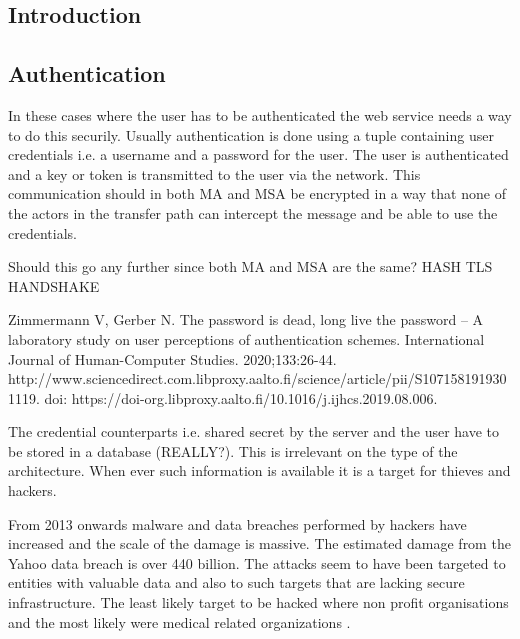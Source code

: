 \subsection{Introduction}

\subsection{Authentication}
\begin{sloppypar}
    In these cases where the user has to be authenticated the web service needs 
    a way to do this securily. Usually authentication is done using a tuple 
    containing user credentials i.e. a username and a password for the user. The
    user is authenticated and a key or token is transmitted to the user via the 
    network. This communication should in both MA and MSA be encrypted in a way 
    that none of the actors in the transfer path can intercept the message and 
    be able to use the credentials.
\end{sloppypar}


    Should this go any further since both MA and MSA are the same?
    HASH
    TLS
    HANDSHAKE

    Zimmermann V, Gerber N. 
    The password is dead, long live the password – A laboratory study on user perceptions of authentication schemes. 
    International Journal of Human-Computer Studies. 2020;133:26-44. http://www.sciencedirect.com.libproxy.aalto.fi/science/article/pii/S1071581919301119. doi: https://doi-org.libproxy.aalto.fi/10.1016/j.ijhcs.2019.08.006.

\begin{sloppypar}
    The credential counterparts i.e. shared secret by the server and the user 
    have to be stored in a database (REALLY?). This is irrelevant on the type 
    of the architecture. When ever such information is available it is a target 
    for thieves and hackers.
\end{sloppypar}
    
\begin{sloppypar}
    From 2013 onwards malware and data breaches performed by hackers have 
    increased and the scale of the damage is massive. The estimated damage 
    from the Yahoo data breach is over 440 billion. The attacks seem to have 
    been targeted to entities with valuable data and also to such targets that 
    are lacking secure infrastructure. The least likely target to be hacked 
    where non profit organisations and the most likely were medical related 
    organizations \citep{breach}.
\end{sloppypar}

